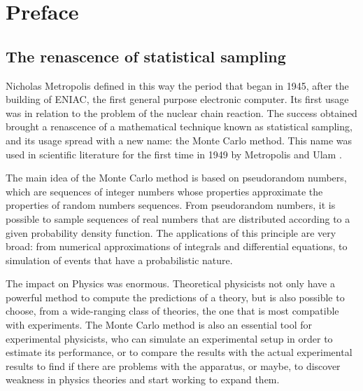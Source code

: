 {}
\begingroup
\let\clearpage\relax
\let\cleardoublepage\relax
\let\cleardoublepage\relax

\chapter*{Preface}

\section*{The renascence of statistical sampling}
Nicholas Metropolis defined in this way \cite{metropolis:1987} the period that began in 1945, after the building of ENIAC, the first general purpose electronic computer.
Its first usage was in relation to the problem of the nuclear chain reaction.
The success obtained brought a renascence of a mathematical technique known as statistical sampling, and its usage spread with a new name: the Monte Carlo method.
This name was used in scientific literature for the first time in 1949 by Metropolis and Ulam \cite{metropolis-ulam:1949}.

The main idea of the Monte Carlo method is based on pseudorandom numbers, which are sequences of integer numbers whose properties approximate the properties of random numbers sequences.
From pseudorandom numbers, it is possible to sample sequences of real numbers that are distributed according to a given probability density function.
The applications of this principle are very broad: from numerical approximations of integrals and differential equations, to simulation of events that have a probabilistic nature.

The impact on Physics was enormous. Theoretical physicists not only have a powerful method to compute the predictions of a theory, but is also possible to choose, from a wide-ranging class of theories, the one that is most compatible with experiments.
The Monte Carlo method is also an essential tool for experimental physicists, who can simulate an experimental setup in order to estimate its performance, or to compare the results with the actual experimental results to find if there are problems with the apparatus, or maybe, to discover weakness in physics theories and start working to expand them.

